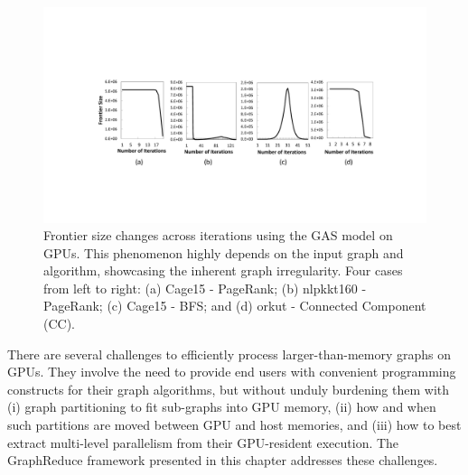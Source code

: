 \begin{figure}[!t]
\centering
\includegraphics[width=\textwidth,height=\textheight,keepaspectratio]	{figures/frontier.pdf}
\caption{Frontier size changes across iterations using the GAS model on GPUs. This phenomenon highly depends on the input graph and algorithm, showcasing the inherent graph irregularity. Four cases from left to right: (a) Cage15 - PageRank; (b) nlpkkt160 - PageRank; (c) Cage15 - BFS; and (d) orkut - Connected Component (CC). 
 }
\label{fig:frontier}
\end{figure}



There are several challenges to efficiently process larger-than-memory graphs on GPUs. They involve the need to provide end
users with convenient programming constructs for their graph algorithms, but without unduly burdening them with (i) graph partitioning to
fit sub-graphs into GPU memory, (ii) how and when such partitions are moved between GPU and host memories, and (iii) how to best
extract multi-level parallelism from their GPU-resident execution. The GraphReduce framework presented in this chapter 
addresses these challenges.




